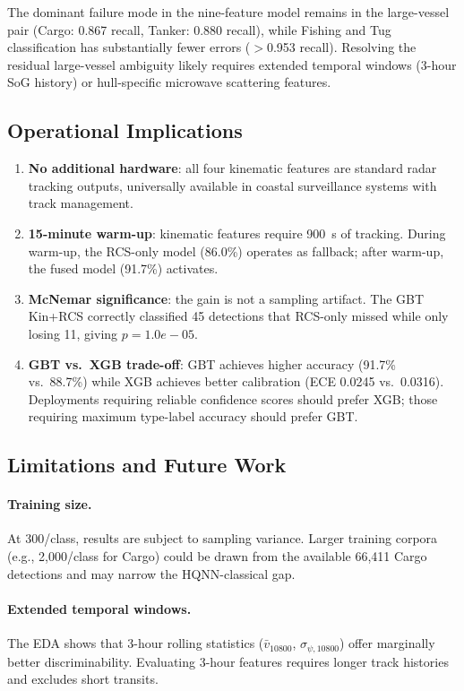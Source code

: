 \documentclass[journal]{IEEEtran}
\begin{document}
The dominant failure mode in the nine-feature model remains in the
large-vessel pair (Cargo: 0.867 recall, Tanker: 0.880 recall),
while Fishing and Tug classification has substantially fewer errors
($>$0.953 recall). Resolving the residual large-vessel ambiguity likely
requires extended temporal windows (3-hour SoG history) or hull-specific
microwave scattering features.

\subsection{Operational Implications}

\begin{enumerate}
\item \textbf{No additional hardware}: all four kinematic features are
  standard radar tracking outputs, universally available in coastal
  surveillance systems with track management.
\item \textbf{15-minute warm-up}: kinematic features require 900~s of
  tracking. During warm-up, the RCS-only model (86.0\%) operates
  as fallback; after warm-up, the fused model (91.7\%) activates.
\item \textbf{McNemar significance}: the gain is not a sampling
  artifact. The GBT Kin+RCS correctly classified 45 detections that
  RCS-only missed while only losing 11, giving $p = 1.0e-05$.
\item \textbf{GBT vs.\ XGB trade-off}: GBT achieves higher accuracy
  (91.7\% vs.\ 88.7\%) while XGB achieves better
  calibration (ECE 0.0245 vs.\ 0.0316). Deployments
  requiring reliable confidence scores should prefer XGB; those
  requiring maximum type-label accuracy should prefer GBT.
\end{enumerate}

\subsection{Limitations and Future Work}

\paragraph{Training size.} At 300/class, results are subject to
sampling variance. Larger training corpora (e.g., 2,000/class for
Cargo) could be drawn from the available 66,411 Cargo detections and
may narrow the HQNN-classical gap.

\paragraph{Extended temporal windows.} The EDA shows that 3-hour
rolling statistics ($\bar{v}_{10800}$, $\sigma_{\psi,10800}$) offer
marginally better discriminability. Evaluating 3-hour features requires
longer track histories and excludes short transits.
\end{document}
